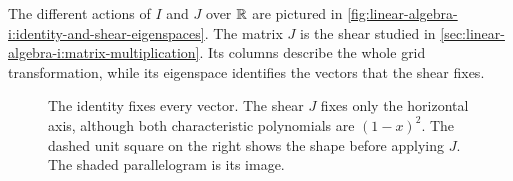 The different actions of \(I\) and \(J\) over \(\mathbb{R}\) are pictured in
\autoref{fig:linear-algebra-i:identity-and-shear-eigenspaces}.
The matrix \(J\) is the shear studied in
\autoref{sec:linear-algebra-i:matrix-multiplication}. Its columns describe
the whole grid transformation, while its eigenspace identifies the
vectors that the shear fixes.
\begin{figure}[htbp]
  \centering
  
  \caption[Equal multiplicities, different eigenspaces]{The identity
    fixes every vector. The shear \(J\) fixes only the horizontal axis,
    although both characteristic polynomials are \((1-x)^2\).
    The dashed unit square on the right shows the shape before applying
    \(J\). The shaded parallelogram is its image.}
  \label{fig:linear-algebra-i:identity-and-shear-eigenspaces}
\end{figure}

